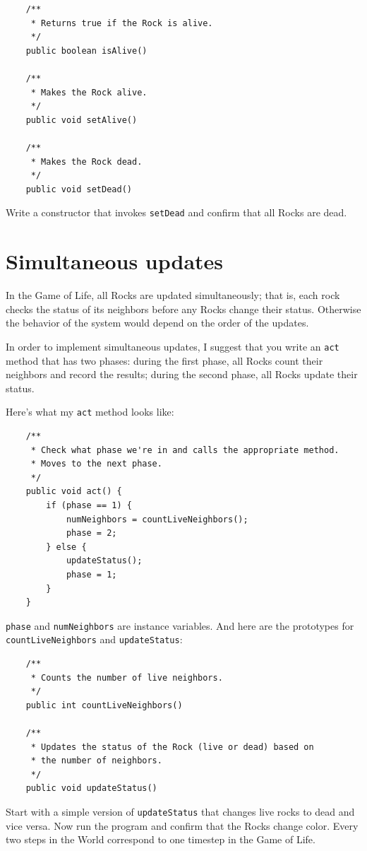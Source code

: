\begin{lstlisting}
    /**
     * Returns true if the Rock is alive.
     */
    public boolean isAlive()

    /**
     * Makes the Rock alive.
     */
    public void setAlive()

    /**
     * Makes the Rock dead.
     */
    public void setDead()
\end{lstlisting}

Write a constructor that invokes {\tt setDead} and confirm that
all Rocks are dead.


\section{Simultaneous updates}

In the Game of Life, all Rocks are updated simultaneously; that is,
each rock checks the status of its neighbors before any Rocks
change their status.  Otherwise the behavior of the system would
depend on the order of the updates.

In order to implement simultaneous updates, I suggest that you write
an {\tt act} method that has two phases: during the first phase,
all Rocks count their neighbors and record the results; during the
second phase, all Rocks update their status.

Here's what my {\tt act} method looks like:

\begin{lstlisting}
    /**
     * Check what phase we're in and calls the appropriate method.
     * Moves to the next phase.
     */
    public void act() {
        if (phase == 1) {
            numNeighbors = countLiveNeighbors();
            phase = 2;
        } else {
            updateStatus();
            phase = 1;
        }
    }
\end{lstlisting}

{\tt phase} and {\tt numNeighbors} are instance variables.
And here are the prototypes for {\tt countLiveNeighbors} and
{\tt updateStatus}:

\begin{lstlisting}
    /**
     * Counts the number of live neighbors.
     */
    public int countLiveNeighbors()

    /**
     * Updates the status of the Rock (live or dead) based on
     * the number of neighbors.
     */
    public void updateStatus()
\end{lstlisting}

Start with a simple version of {\tt updateStatus} that changes live
rocks to dead and vice versa.  Now run the program and confirm that
the Rocks change color.  Every two steps in the World correspond to
one timestep in the Game of Life.

